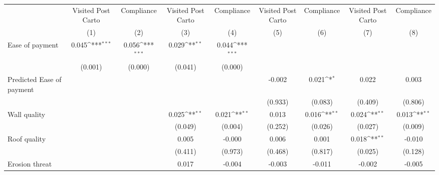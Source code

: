 {
\def\sym#1{\ifmmode^{#1}\else\(^{#1}\)\fi}
\begin{tabular}{l*{8}{c}}
\toprule
                &\multicolumn{1}{c}{Visited Post Carto}&\multicolumn{1}{c}{Compliance}&\multicolumn{1}{c}{Visited Post Carto}&\multicolumn{1}{c}{Compliance}&\multicolumn{1}{c}{Visited Post Carto}&\multicolumn{1}{c}{Compliance}&\multicolumn{1}{c}{Visited Post Carto}&\multicolumn{1}{c}{Compliance}\\
                &\multicolumn{1}{c}{(1)}         &\multicolumn{1}{c}{(2)}         &\multicolumn{1}{c}{(3)}         &\multicolumn{1}{c}{(4)}         &\multicolumn{1}{c}{(5)}         &\multicolumn{1}{c}{(6)}         &\multicolumn{1}{c}{(7)}         &\multicolumn{1}{c}{(8)}         \\
\midrule
Ease of payment &    0.045\sym{***}&    0.056\sym{***}&    0.029\sym{**} &    0.044\sym{***}&                  &                  &                  &                  \\
                &  (0.001)         &  (0.000)         &  (0.041)         &  (0.000)         &                  &                  &                  &                  \\
Predicted Ease of payment&                  &                  &                  &                  &   -0.002         &    0.021\sym{*}  &    0.022         &    0.003         \\
                &                  &                  &                  &                  &  (0.933)         &  (0.083)         &  (0.409)         &  (0.806)         \\
Wall quality    &                  &                  &    0.025\sym{**} &    0.021\sym{**} &    0.013         &    0.016\sym{**} &    0.024\sym{**} &    0.013\sym{**} \\
                &                  &                  &  (0.049)         &  (0.004)         &  (0.252)         &  (0.026)         &  (0.027)         &  (0.009)         \\
Roof quality    &                  &                  &    0.005         &   -0.000         &    0.006         &    0.001         &    0.018\sym{**} &   -0.010         \\
                &                  &                  &  (0.411)         &  (0.973)         &  (0.468)         &  (0.817)         &  (0.025)         &  (0.128)         \\
Erosion threat  &                  &                  &    0.017         &   -0.004         &   -0.003         &   -0.011         &   -0.002         &   -0.005         \\

\end{tabular}}
